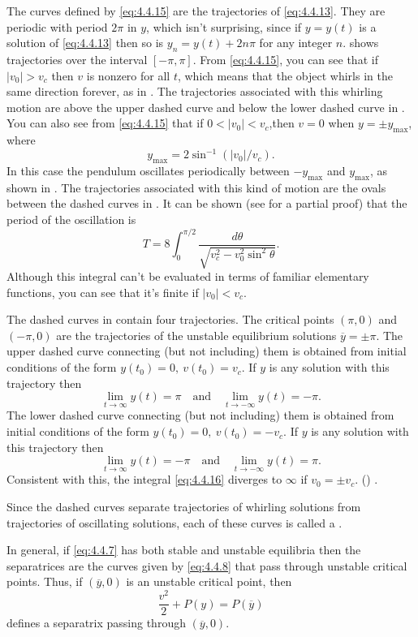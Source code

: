 \begin{example}
The curves defined by \eqref{eq:4.4.15} are the trajectories of
\eqref{eq:4.4.13}. They are periodic with period $2\pi$ in $y$, which isn't
 surprising, since if $y=y(t)$ is a solution of \eqref{eq:4.4.13} then
so is $y_n=y(t)+2n\pi$ for any integer $n$. 
shows trajectories over the interval $[-\pi,\pi]$. From \eqref{eq:4.4.15},
you can see that if $|v_0|>v_c$ then $v$ is nonzero for all $t$, which
means that the object whirls in the same direction forever, as in
. The trajectories associated with this
whirling motion are above the upper dashed curve and below the lower
dashed curve in . You can also see from
\eqref{eq:4.4.15} that if $0<|v_0|<v_c$,then $v=0$ when $y=\pm y_{\max}$,
where
\[
y_{\max}=2\sin^{-1}(|v_0|/v_c).
\]
In this case the pendulum oscillates periodically between $-y_{\max}$
and $y_{\max}$, as shown in . The
trajectories associated with this kind of motion are the ovals between
the dashed curves in . It can be shown (see
 for a partial proof) that the period of the
oscillation is
\begin{equation} \label{eq:4.4.16}
T=8\int_0^{\pi/2}\frac{d\theta}{\sqrt{v_c^2-v_0^2\sin^2\theta}}.
\end{equation}
Although this integral can't be evaluated in terms of familiar
elementary functions, you can see that it's finite if $|v_0|<v_c$.

The dashed curves in  contain four
trajectories. The critical points $(\pi,0)$ and $(-\pi,0)$ are the
trajectories of the unstable equilibrium solutions $\overline
y=\pm\pi$.
The upper dashed curve connecting (but not including) them is obtained
from initial conditions of the form $y(t_0)=0,\ v(t_0)=v_c$. If $y$ is
any solution with this trajectory then
\[
\lim_{t\to\infty}y(t)=\pi\quad\text{and}\quad\lim_{t\to-\infty}y(t)=-\pi.
\]
The lower dashed curve connecting (but not including) them is obtained
from initial conditions of the form $y(t_0)=0,\ v(t_0)=-v_c$. If $y$
is any solution with this trajectory then
\[
\lim_{t\to\infty}y(t)=-\pi\quad\text{and}\quad\lim_{t\to-\infty}y(t)=\pi.
\]
Consistent with this, the integral \eqref{eq:4.4.16} diverges to $\infty$
if $v_0=\pm v_c$. () .

Since the dashed curves separate trajectories of whirling solutions
from trajectories of oscillating solutions, each of these curves is
called a .

In general, if \eqref{eq:4.4.7} has both stable and unstable equilibria
then the separatrices are the curves given by \eqref{eq:4.4.8} that pass
through unstable critical points. Thus, if $(\overline y,0)$ is an
unstable critical point, then
\begin{equation} \label{eq:4.4.17}
\frac{v^2}{2}+P(y)=P(\overline y)
\end{equation}
defines a separatrix passing through $(\overline y,0)$.
\end{example}

